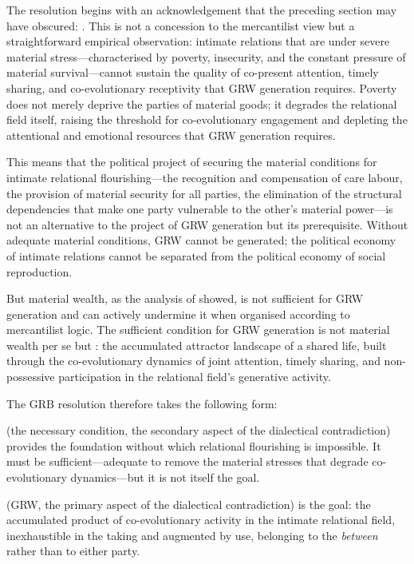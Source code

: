 The resolution begins with an acknowledgement that the preceding section may have obscured: . This is not a concession to the mercantilist view but a straightforward empirical observation: intimate relations that are under severe material stress---characterised by poverty, insecurity, and the constant pressure of material survival---cannot sustain the quality of co-present attention, timely sharing, and co-evolutionary receptivity that GRW generation requires. Poverty does not merely deprive the parties of material goods; it degrades the relational field itself, raising the threshold for co-evolutionary engagement and depleting the attentional and emotional resources that GRW generation requires.

This means that the political project of securing the material conditions for intimate relational flourishing---the recognition and compensation of care labour, the provision of material security for all parties, the elimination of the structural dependencies that make one party vulnerable to the other's material power---is not an alternative to the project of GRW generation but its prerequisite. Without adequate material conditions, GRW cannot be generated; the political economy of intimate relations cannot be separated from the political economy of social reproduction.

But material wealth, as the analysis of  showed, is not sufficient for GRW generation and can actively undermine it when organised according to mercantilist logic. The sufficient condition for GRW generation is not material wealth per se but : the accumulated attractor landscape of a shared life, built through the co-evolutionary dynamics of joint attention, timely sharing, and non-possessive participation in the relational field's generative activity.

The GRB resolution therefore takes the following form:

 (the necessary condition, the secondary aspect of the dialectical contradiction) provides the foundation without which relational flourishing is impossible. It must be sufficient---adequate to remove the material stresses that degrade co-evolutionary dynamics---but it is not itself the goal.

 (GRW, the primary aspect of the dialectical contradiction) is the goal: the accumulated product of co-evolutionary activity in the intimate relational field, inexhaustible in the taking and augmented by use, belonging to the \emph{between} rather than to either party.

